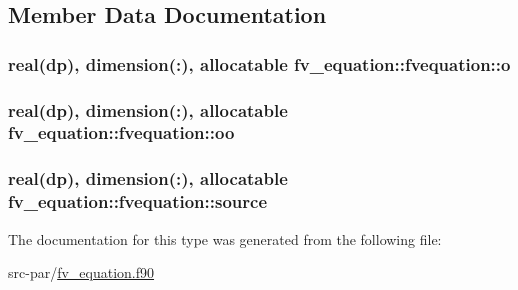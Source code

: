 \subsection{Member Data Documentation}
\hypertarget{structfv__equation_1_1fvequation_ad6a75f5fc5341eeee3247dc71286bd24}{
\subsubsection[{o}]{\setlength{\rightskip}{0pt plus 5cm}real(dp), dimension(\-:), allocatable fv\-\_\-equation\-::fvequation\-::o}}\label{structfv__equation_1_1fvequation_ad6a75f5fc5341eeee3247dc71286bd24}
\hypertarget{structfv__equation_1_1fvequation_ab71f5aa786a1f668f5389e466db9ade8}{
\subsubsection[{oo}]{\setlength{\rightskip}{0pt plus 5cm}real(dp), dimension(\-:), allocatable fv\-\_\-equation\-::fvequation\-::oo}}\label{structfv__equation_1_1fvequation_ab71f5aa786a1f668f5389e466db9ade8}
\hypertarget{structfv__equation_1_1fvequation_a5e62f6aa9945885b4569e307c550f1f7}{
\subsubsection[{source}]{\setlength{\rightskip}{0pt plus 5cm}real(dp), dimension(\-:), allocatable fv\-\_\-equation\-::fvequation\-::source}}\label{structfv__equation_1_1fvequation_a5e62f6aa9945885b4569e307c550f1f7}


The documentation for this type was generated from the following file\-:\begin{DoxyCompactItemize}
\item 
src-\/par/\hyperlink{fv__equation_8f90}{fv\-\_\-equation.\-f90}\end{DoxyCompactItemize}

